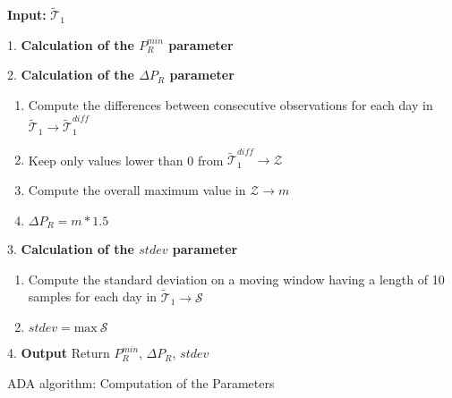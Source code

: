 \documentclass{article}
\begin{document}
\begin{algorithm}[t]
\textbf{Input: }  $\widetilde{\mathcal{T}}_1$

1. \textbf{Calculation of the $P_R^{min}$ parameter}\
   \begin{algorithmic}[1]
        \State{ $P_R^{min} = \text{min} \ \boldsymbol{a}$}
    \end{algorithmic}

2. \textbf{Calculation of the $\Delta P_R$ parameter}    
    \begin{enumerate}
        \item Compute the differences between consecutive observations for each day in $ \widetilde{\mathcal{T}}_1 \rightarrow \widetilde{\mathcal{T}}_1^{diff}$
        \item Keep only values lower than 0 from $\widetilde{\mathcal{T}}_1^{diff} \rightarrow \mathcal{Z}$
        \item Compute the overall maximum value in $\mathcal{Z} \rightarrow m$
        \item $\Delta P_R = m * 1.5$
    \end{enumerate}
3. \textbf{Calculation of the $stdev$ parameter}
    \begin{enumerate}
        \item Compute the standard deviation on a moving window having a length of 10 samples for each day in $\widetilde{\mathcal{T}}_1 \rightarrow \mathcal{S}$
        \item  $stdev = \text{max} \ \mathcal{S}$
    \end{enumerate}
4. \textbf{Output} Return $P_R^{min}$, $\Delta P_R$, $stdev$
\caption{ADA algorithm: Computation of the Parameters}
\label{algo:parameters}
\end{algorithm}
\end{document}
